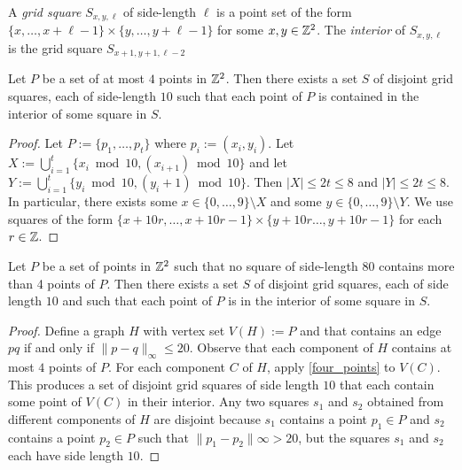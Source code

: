 \documentclass{patmorin}
\begin{document}
A \emph{grid square} $S_{x,y,\ell}$ of side-length $\ell$ is a point set of the form $\{x,\ldots,x+\ell-1\}\times\{y,\ldots,y+\ell-1\}$ for some $x,y\in\mathbb{Z}^2$.  The \emph{interior} of $S_{x,y,\ell}$ is the grid square $S_{x+1,y+1,\ell-2}$

\begin{lem}\label{four_points}
  Let $P$ be a set of at most $4$ points in $\mathbb{Z}^2$.  Then there exists a set $S$ of disjoint grid squares, each of side-length $10$ such that each point of $P$ is contained in the interior of some square in $S$.
\end{lem}

\begin{proof}
  Let $P:=\{p_1,\ldots,p_t\}$ where $p_i:=(x_i,y_i)$.  Let $X:=\bigcup_{i=1}^t \{x_i\bmod 10,(x_{i+1})\bmod 10\}$ and let $Y:=\bigcup_{i=1}^t\{y_i\bmod 10,(y_i+1)\bmod 10\}$.  Then $|X|\le 2t\le 8$ and $|Y|\le 2t\le 8$.  In particular, there exists some $x\in\{0,\ldots,9\}\setminus X$ and some $y\in\{0,\ldots,9\}\setminus Y$.  We use squares of the form $\{x+10r,\ldots,x+10r-1\}\times\{y+10r\ldots,y+10r-1\}$ for each $r\in\mathbb{Z}$.
\end{proof}

\begin{lem}
  Let $P$ be a set of points in $\mathbb{Z}^2$ such that no square of side-length $80$ contains more than 4 points of $P$.  Then there exists a set $S$ of disjoint grid squares, each of side length $10$ and such that each point of $P$ is in the interior of some square in $S$.
\end{lem}

\begin{proof}
  Define a graph $H$ with vertex set $V(H):=P$ and that contains an edge $pq$ if and only if $\|p-q\|_\infty \le 20$. Observe that each component of $H$ contains at most $4$ points of $P$.  For each component $C$ of $H$, apply \cref{four_points} to $V(C)$.  This produces a set of disjoint grid squares of side length $10$ that each contain some point of $V(C)$ in their interior.  Any two squares $s_1$ and $s_2$ obtained from different components of $H$ are disjoint because $s_1$ contains a point $p_1\in P$ and $s_2$ contains a point $p_2\in P$ such that $\|p_1-p_2\|\infty > 20$, but the squares $s_1$ and $s_2$ each have side length $10$.
\end{proof}

\end{document}

